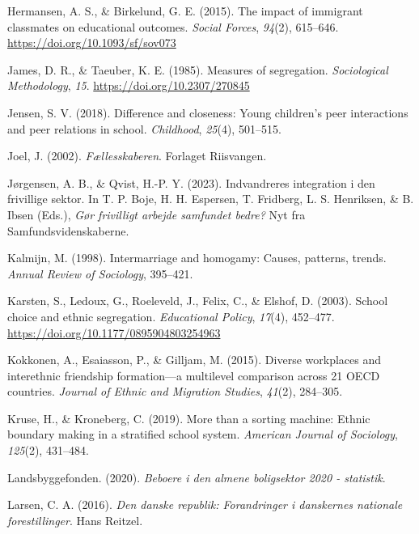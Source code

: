 \documentclass[
]{book}
\newlength{\cslhangindent}
\newenvironment{CSLReferences}[2] %
 {\begin{list}{}{%
  \setlength{\itemindent}{0pt}
  \setlength{\leftmargin}{0pt}
  \setlength{\parsep}{0pt}
  \ifodd #1
   \setlength{\leftmargin}{\cslhangindent}
   \setlength{\itemindent}{-1\cslhangindent}
  \fi
  \setlength{\itemsep}{#2\baselineskip}}}
 {\end{list}}
\begin{document}
\begin{CSLReferences}{1}{0}
Hermansen, A. S., \& Birkelund, G. E. (2015). The impact of immigrant classmates on educational outcomes. \emph{Social Forces}, \emph{94}(2), 615--646. \url{https://doi.org/10.1093/sf/sov073}

James, D. R., \& Taeuber, K. E. (1985). Measures of segregation. \emph{Sociological Methodology}, \emph{15}. \url{https://doi.org/10.2307/270845}

Jensen, S. V. (2018). Difference and closeness: Young children's peer interactions and peer relations in school. \emph{Childhood}, \emph{25}(4), 501--515.

Joel, J. (2002). \emph{Fællesskaberen}. Forlaget Riisvangen.

Jørgensen, A. B., \& Qvist, H.-P. Y. (2023). Indvandreres integration i den frivillige sektor. In T. P. Boje, H. H. Espersen, T. Fridberg, L. S. Henriksen, \& B. Ibsen (Eds.), \emph{Gør frivilligt arbejde samfundet bedre?} Nyt fra Samfundsvidenskaberne.

Kalmijn, M. (1998). Intermarriage and homogamy: Causes, patterns, trends. \emph{Annual Review of Sociology}, 395--421.

Karsten, S., Ledoux, G., Roeleveld, J., Felix, C., \& Elshof, D. (2003). School choice and ethnic segregation. \emph{Educational Policy}, \emph{17}(4), 452--477. \url{https://doi.org/10.1177/0895904803254963}

Kokkonen, A., Esaiasson, P., \& Gilljam, M. (2015). Diverse workplaces and interethnic friendship formation---a multilevel comparison across 21 OECD countries. \emph{Journal of Ethnic and Migration Studies}, \emph{41}(2), 284--305.

Kruse, H., \& Kroneberg, C. (2019). More than a sorting machine: Ethnic boundary making in a stratified school system. \emph{American Journal of Sociology}, \emph{125}(2), 431--484.

Landsbyggefonden. (2020). \emph{Beboere i den almene boligsektor 2020 - statistik}.

Larsen, C. A. (2016). \emph{Den danske republik: Forandringer i danskernes nationale forestillinger}. Hans Reitzel.


\end{CSLReferences}
\end{document}
